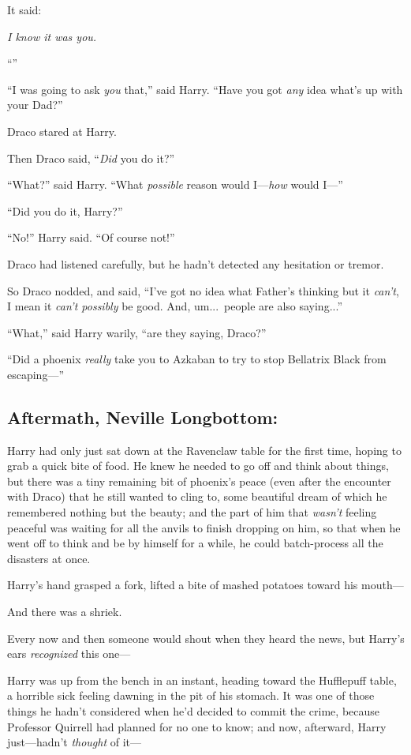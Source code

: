 It said:

\emph{I know it was you.}

“”

“I was going to ask \emph{you} that,” said Harry. “Have you got \emph{any} idea what’s up with your Dad?”

Draco stared at Harry.

Then Draco said, “\emph{Did} you do it?”

“What?” said Harry. “What \emph{possible} reason would I—\emph{how} would I—”

“Did you do it, Harry?”

“No!” Harry said. “Of course not!”

Draco had listened carefully, but he hadn’t detected any hesitation or tremor.

So Draco nodded, and said, “I’ve got no idea what Father’s thinking but it \emph{can’t}, I mean it \emph{can’t possibly} be good. And, um...\ people are also saying...”

“What,” said Harry warily, “are they saying, Draco?”

“Did a phoenix \emph{really} take you to Azkaban to try to stop Bellatrix Black from escaping—”
\replacement{\sbreak}{}

\subsection{Aftermath, Neville Longbottom:}

\noindent{}Harry had only just sat down at the Ravenclaw table for the first time, hoping to grab a quick bite of food. He knew he needed to go off and think about things, but there was a tiny remaining bit of phoenix’s peace (even after the encounter with Draco) that he still wanted to cling to, some beautiful dream of which he remembered nothing but the beauty; and the part of him that \emph{wasn’t} feeling peaceful was waiting for all the anvils to finish dropping on him, so that when he went off to think and be by himself for a while, he could batch-process all the disasters at once.

Harry’s hand grasped a fork, lifted a bite of mashed potatoes toward his mouth—

And there was a shriek.

Every now and then someone would shout when they heard the news, but Harry’s ears \emph{recognized} this one—

Harry was up from the bench in an instant, heading toward the Hufflepuff table, a horrible sick feeling dawning in the pit of his stomach. It was one of those things he hadn’t considered when he’d decided to commit the crime, because Professor Quirrell had planned for no one to know; and now, afterward, Harry just—hadn’t \emph{thought} of it—

